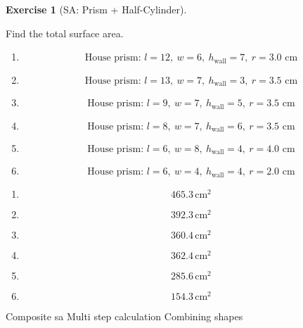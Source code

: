 \documentclass[
  letterpaper,
  DIV=11,
  numbers=noendperiod]{scrreprt}
\theoremstyle{definition}
\newtheorem{exercise}{Exercise}[chapter]
\theoremstyle{remark}
\begin{document}
\begin{exercise}[SA: Prism +
Half-Cylinder]\protect\hypertarget{exr-sa-10}{}\label{exr-sa-10}

Find the total surface area.

\begin{enumerate}
\def\labelenumi{\alph{enumi})}
\item
  \[\text{House prism: }l=12,\ w=6,\ h_{\text{wall}}=7,\ r=3.0\text{ cm}\]
\item
  \[\text{House prism: }l=13,\ w=7,\ h_{\text{wall}}=3,\ r=3.5\text{ cm}\]
\item
  \[\text{House prism: }l=9,\ w=7,\ h_{\text{wall}}=5,\ r=3.5\text{ cm}\]
\item
  \[\text{House prism: }l=8,\ w=7,\ h_{\text{wall}}=6,\ r=3.5\text{ cm}\]
\item
  \[\text{House prism: }l=6,\ w=8,\ h_{\text{wall}}=4,\ r=4.0\text{ cm}\]
\item
  \[\text{House prism: }l=6,\ w=4,\ h_{\text{wall}}=4,\ r=2.0\text{ cm}\]
\end{enumerate}

\begin{tcolorbox}[enhanced jigsaw, opacitybacktitle=0.6, coltitle=black, arc=.35mm, colframe=quarto-callout-tip-color-frame, colback=white, bottomrule=.15mm, left=2mm, colbacktitle=quarto-callout-tip-color!10!white, titlerule=0mm, opacityback=0, title=\textcolor{quarto-callout-tip-color}{\faLightbulb}\hspace{0.5em}{🔍 View Solution}, leftrule=.75mm, breakable, rightrule=.15mm, bottomtitle=1mm, toptitle=1mm, toprule=.15mm]

\begin{enumerate}
\def\labelenumi{\alph{enumi})}
\item
  \[465.3\,\text{cm}^{2}\]
\item
  \[392.3\,\text{cm}^{2}\]
\item
  \[360.4\,\text{cm}^{2}\]
\item
  \[362.4\,\text{cm}^{2}\]
\item
  \[285.6\,\text{cm}^{2}\]
\item
  \[154.3\,\text{cm}^{2}\]
\end{enumerate}

\end{tcolorbox}

{Composite sa} {Multi step calculation} {Combining shapes}

\end{exercise}
\end{document}
